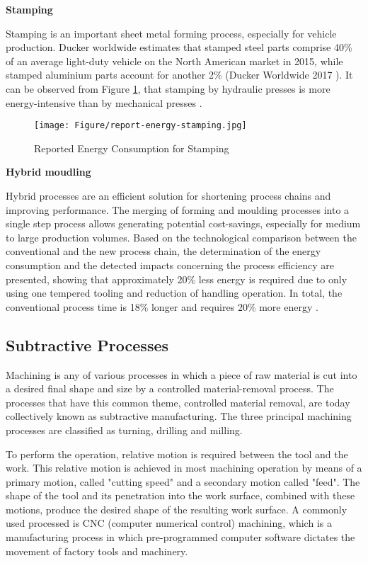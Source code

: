 \textbf{Stamping}

Stamping is an important sheet metal forming process, especially for vehicle production. Ducker worldwide estimates that stamped steel parts comprise 40\% of an average light-duty vehicle on the North American market in 2015, while stamped aluminium parts account for another 2\% (Ducker Worldwide 2017 \cite{Dai2017}). It can be observed from Figure \ref{fig:stampingenergy}, that stamping by hydraulic presses is more energy-intensive than by mechanical presses \cite{Dai2017}.

\begin{figure}[h!]
	\centering
	\texttt{[image: Figure/report-energy-stamping.jpg]}
	\caption{Reported Energy Consumption for Stamping}
	\label{fig:stampingenergy}
\end{figure}

\textbf{Hybrid moudling}

Hybrid processes are an efficient solution for shortening process chains and improving performance. The merging of forming and moulding processes into a single step process allows generating potential cost-savings, especially for medium to large production volumes. Based on the technological comparison between the conventional and the new process chain, the determination of the energy consumption and the detected impacts concerning the process efficiency are presented, showing that approximately 20\% less energy is required due to only using one tempered tooling and reduction of handling operation. In total, the conventional process time is 18\% longer and requires 20\% more energy \cite{Landgrebe2016}.

\subsection{Subtractive Processes}

Machining is any of various processes in which a piece of raw material is cut into a desired final shape and size by a controlled material-removal process. The processes that have this common theme, controlled material removal, are today collectively known as subtractive manufacturing. The three principal machining processes are classified as turning, drilling and milling. 

To perform the operation, relative motion is required between the tool and the work. This relative motion is achieved in most machining operation by means of a primary motion, called "cutting speed" and a secondary motion called "feed". The shape of the tool and its penetration into the work surface, combined with these motions, produce the desired shape of the resulting work surface. A commonly used processed is CNC (computer numerical control) machining, which is a manufacturing process in which pre-programmed computer software dictates the movement of factory tools and machinery.

